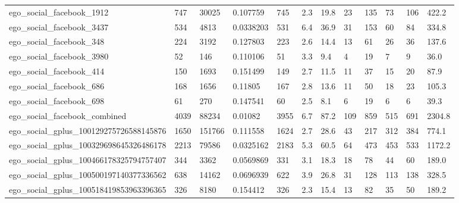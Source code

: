 \begin{longtable}{llllllllllll}
 ego\_social\_facebook\_1912                           & 747        & 30025     & 0.107759    & 745   & 2.3    & 19.8   & 23    & 135    & 73     & 106    & 422.2   \\
 ego\_social\_facebook\_3437                           & 534        & 4813      & 0.0338203   & 531   & 6.4    & 36.9   & 31    & 153    & 60     & 84     & 334.8   \\
 ego\_social\_facebook\_348                            & 224        & 3192      & 0.127803    & 223   & 2.6    & 14.4   & 13    & 61     & 26     & 36     & 137.6   \\
 ego\_social\_facebook\_3980                           & 52         & 146       & 0.110106    & 51    & 3.3    & 9.4    & 4     & 19     & 7      & 9      & 36.0    \\
 ego\_social\_facebook\_414                            & 150        & 1693      & 0.151499    & 149   & 2.7    & 11.5   & 11    & 37     & 15     & 20     & 87.9    \\
 ego\_social\_facebook\_686                            & 168        & 1656      & 0.11805     & 167   & 2.8    & 13.6   & 11    & 50     & 18     & 23     & 105.3   \\
 ego\_social\_facebook\_698                            & 61         & 270       & 0.147541    & 60    & 2.5    & 8.1    & 6     & 19     & 6      & 6      & 39.3    \\
 ego\_social\_facebook\_combined                       & 4039       & 88234     & 0.01082     & 3955  & 6.7    & 87.2   & 109   & 859    & 515    & 691    & 2304.8  \\
 ego\_social\_gplus\_100129275726588145876             & 1650       & 151766    & 0.111558    & 1624  & 2.7    & 28.6   & 43    & 217    & 312    & 384    & 774.1   \\
 ego\_social\_gplus\_100329698645326486178             & 2213       & 79586     & 0.0325162   & 2183  & 5.3    & 60.5   & 64    & 473    & 453    & 533    & 1172.2  \\
 ego\_social\_gplus\_100466178325794757407             & 344        & 3362      & 0.0569869   & 331   & 3.1    & 18.3   & 18    & 78     & 44     & 60     & 189.0   \\
 ego\_social\_gplus\_100500197140377336562             & 638        & 14162     & 0.0696939   & 622   & 3.9    & 26.8   & 31    & 128    & 113    & 138    & 328.5   \\
 ego\_social\_gplus\_100518419853963396365             & 326        & 8180      & 0.154412    & 326   & 2.3    & 15.4   & 13    & 82     & 35     & 50     & 189.2   \\

\end{longtable}
